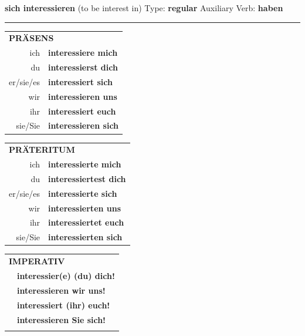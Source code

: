\documentclass[10pt,a4paper]{revtex4-2}
\begin{document}
\begin{verbbox}
    {\Large \bf sich interessieren} (to be interest in) \hfill Type: \textbf{regular} \hfill Auxiliary Verb: \textbf{haben} 
    
     \vspace{5pt}

    \hrule
    
    \vspace{5pt}

  \begin{tabular}{rl}
     \multicolumn{2}{l}{\textbf{PRÄSENS} }\\
    ich & \textbf{interessiere mich}\\
    du & \textbf{interessierst dich}\\
    er/sie/es & \textbf{interessiert sich}\\
    wir & \textbf{interessieren uns}\\
    ihr & \textbf{interessiert euch}\\
    sie/Sie & \textbf{interessieren sich}\\
  \end{tabular}
  \hfill
     \begin{tabular}{rl}
    \multicolumn{2}{l}{\textbf{PRÄTERITUM} }\\
    ich & \textbf{interessierte mich}\\
    du & \textbf{interessiertest dich}\\
    er/sie/es & \textbf{interessierte sich}\\
    wir & \textbf{interessierten uns}\\
    ihr & \textbf{interessiertet euch}\\
    sie/Sie & \textbf{interessierten sich}\\
  \end{tabular}
  \hfill
  \begin{tabular}{rl}
     \multicolumn{2}{l}{\textbf{IMPERATIV} }\\
   & \textbf{interessier(e) (du) dich!}\\
   & \textbf{interessieren wir uns!}\\
   & \textbf{interessiert (ihr) euch!}\\
   & \textbf{interessieren Sie sich!}\\
   & \vspace{10pt}
  \end{tabular}


\end{verbbox}
\end{document}
